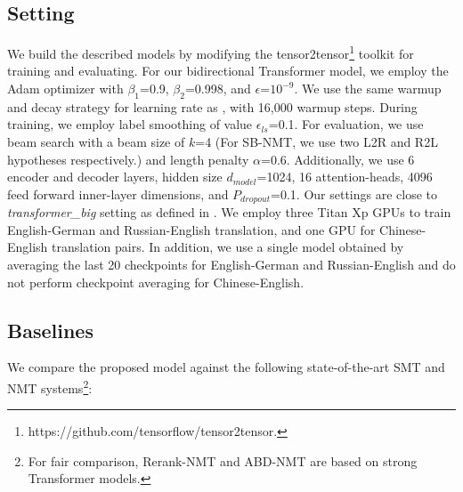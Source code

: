 \documentclass[11pt,a4paper]{article}
\begin{document}
\begin{CJK*}{UTF8}{gbsn}
\subsection{Setting}
We build the described models by modifying the tensor2tensor{\footnote[9]{https://github.com/tensorflow/tensor2tensor.}} toolkit for training and evaluating.
For our bidirectional Transformer model, we employ the Adam optimizer with $\beta_1$=0.9, $\beta_2$=0.998, and $\epsilon$=$10^{-9}$. We use the same warmup and decay strategy for learning rate as , with 16,000 warmup steps.
During training, we employ label smoothing of value $\epsilon_{ls}$=0.1.
For evaluation, we use beam search with a beam size of $k$=4 (For SB-NMT, we use two L2R and R2L hypotheses respectively.) and length penalty $\alpha$=0.6.
Additionally, we use 6 encoder and decoder layers, hidden size $d_{model}$=1024, 16 attention-heads, 4096 feed forward inner-layer dimensions, and $P_{dropout}$=0.1.
Our settings are close to \emph{transformer\_big} setting as defined in .
We employ three Titan Xp GPUs to train English-German and Russian-English translation, and one GPU for Chinese-English translation pairs. In addition, we use a single model obtained by averaging the last 20 checkpoints for English-German and Russian-English and do not perform checkpoint averaging for Chinese-English.





\subsection{Baselines}

We compare the proposed model against the following state-of-the-art SMT and NMT systems{\footnote[10]{For fair comparison, Rerank-NMT and ABD-NMT are based on strong Transformer models.}}:


\end{CJK*}
\end{document}
